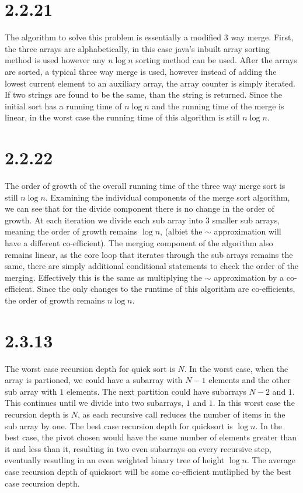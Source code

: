 \documentclass[12pt]{article}
\begin{document}
\section*{2.2.21}

The algorithm to solve this problem is essentially a modified 3 way merge.
First, the three arrays are alphabetically, in this case java's inbuilt 
array sorting method is used however any $n\log{n}$ sorting method can be
used. After the arrays are sorted, a typical three way merge is used, 
however instead of adding the lowest current element to an auxiliary 
array, the array counter is simply iterated. If two strings are found to 
be the same, than the string is returned. Since the initial sort has a 
running time of $n\log{n}$ and the running time of the merge is linear, 
in the worst case the running time of this algorithm is still $n\log{n}$.

\noindent 

\section*{2.2.22}

The order of growth of the overall running time of the three way merge sort
is still $n\log{n}$. Examining the individual components of the merge sort
algorithm, we can see that for the divide component there is no change in
the order of growth. At each iteration we divide each sub array into 3 smaller
sub arrays, meaning the order of growth remains $\log{n}$, (albiet the $\sim$
approximation will have a different co-efficient). The merging component of
the algorithm also remains linear, as the core loop that iterates through 
the sub arrays remains the same, there are simply additional conditional
statements to check the order of the merging. Effectively this is the same as 
multiplying the $\sim$ approximation by a co-efficient. Since the only changes
to the runtime of this algorithm are co-efficients, the order of growth remains
$n\log{n}$.

\section*{2.3.13}

The worst case recursion depth for quick sort is $N$. In the worst case,
when the array is partioned, we could have a subarray with $N - 1$ elements and
the other sub array with $1$ elements. The next partition could have subarrays 
$N - 2$ and $1$. This continues until we divide into two subarrays, $1$ and $1$.
In this worst case the recursion depth is $N$, as each recursive call reduces
the number of items in the sub array by one. The best case recursion depth 
for quicksort is $\log{n}$. In the best case, the pivot chosen would have the
same number of elements greater than it and less than it, resulting in 
two even subarrays on every recursive step, eventually resutling in an 
even weighted binary tree of height $\log{n}$. The average case recursion depth
of quicksort will be some co-efficient mutliplied by the best case recursion depth.
\end{document}

